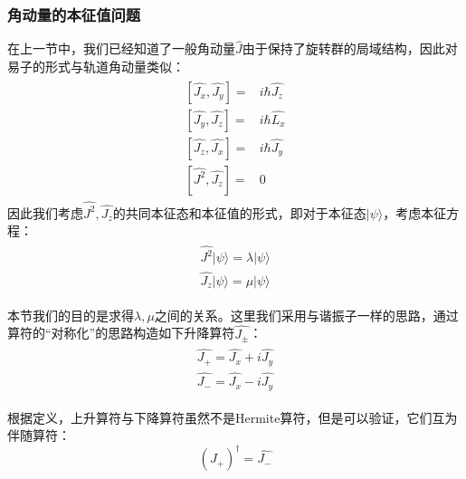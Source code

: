         \subsubsection{角动量的本征值问题}\label{section5.3.1}
        在上一节中，我们已经知道了一般角动量$\hat{J}$由于保持了旋转群的局域结构，因此对易子的形式与轨道角动量类似：
         \begin{align}
             \begin{split}
                [ \hat{J_x},\hat{J_y} ] =& i\hbar \hat{J_z}\\
                 [ \hat{J_y},\hat{J_z} ] =& i\hbar \hat{L_x}\\
                [ \hat{J_z},\hat{J_x} ] =& i\hbar \hat{J_y}\\
                [ \hat{J^2},\hat{J_z} ] =&0
            \end{split}
        \end{align}   
        因此我们考虑$\hat{J^2},\hat{J_z}$的共同本征态和本征值的形式，即对于本征态$|\psi \rangle$，考虑本征方程：
        \begin{align}\label{equ:5.9}
            \begin{split}
                \hat{J^2}|\psi \rangle = \lambda |\psi \rangle\\
                \hat{J_z}|\psi \rangle=\mu |\psi \rangle
            \end{split}
            \end{align}   
            
        本节我们的目的是求得$\lambda,\mu$之间的关系。这里我们采用与谐振子一样的思路，通过算符的“对称化”的思路构造如下升降算符$\hat{J_\pm}$：
         \begin{align}
            \begin{split}
                \hat{J_+}=\hat{J_x}+i\hat{J_y}\\
                \hat{J_-}=\hat{J_x}-i\hat{J_y}
            \end{split}
        \end{align} 
            
        根据定义，上升算符与下降算符虽然不是Hermite算符，但是可以验证，它们互为伴随算符：
        \begin{equation}
           ( \hat{J_+})^\dagger = \hat{J_-}
        \end{equation}
        
